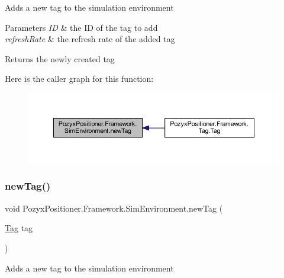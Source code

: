 Adds a new tag to the simulation environment 


\begin{DoxyParams}{Parameters}
{\em ID} & the ID of the tag to add\\
\hline
{\em refresh\+Rate} & the refresh rate of the added tag\\
\hline
\end{DoxyParams}
\begin{DoxyReturn}{Returns}
the newly created tag 
\end{DoxyReturn}
Here is the caller graph for this function\+:\nopagebreak
\begin{figure}[H]
\begin{center}
\leavevmode
\includegraphics[width=350pt]{class_pozyx_positioner_1_1_framework_1_1_sim_environment_ad523ae9a258ae7b68d7f966be92ff3bb_icgraph}
\end{center}
\end{figure}
\mbox{\label{class_pozyx_positioner_1_1_framework_1_1_sim_environment_ae804be21b53900cbac13c0cce385b170}} 
\subsubsection{\texorpdfstring{new\+Tag()}{newTag()}\hspace{0.1cm}{\footnotesize\ttfamily [2/2]}}
{\footnotesize\ttfamily void Pozyx\+Positioner.\+Framework.\+Sim\+Environment.\+new\+Tag (\begin{DoxyParamCaption}\item[{\hyperlink{class_pozyx_positioner_1_1_framework_1_1_tag}{Tag}}]{tag }\end{DoxyParamCaption})}



Adds a new tag to the simulation environment 


